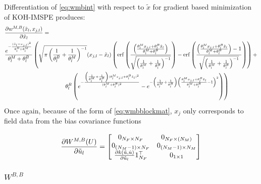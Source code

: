 \documentclass[
]{article}
\begin{document}
Differentiation of \eqref{eq:wmbint} with respect to \(\tilde{x}\) for
gradient based minimization of KOH-IMSPE produces:
\begin{equation}
\begin{split}
&\frac{\partial w^{M,B}(\tilde{x}_l,x_{j,l})}{\partial \tilde{x}_l} = \\
&\frac{e^{-\frac{(\tilde{x}_l - x_{j,l})^2}{\theta^B_l + \theta_l^M}}}{\theta_l^M + \theta^B_l} \left(\sqrt{\pi \left(\frac{1}{\theta^B_l} + \frac{1}{\theta_l^M}\right)^{-1}}(x_{j,l} -\tilde{x}_l)\left(\mathrm{erf}\left(\frac{\left(\frac{\theta_l^M x_{j,l} + \theta^B_l \tilde{x}_l}{\theta_l^M + \theta^B_l}\right)}{\sqrt{\left(\frac{1}{\theta_l^M} + \frac{1}{\theta^B_l}\right)^{-1}}}\right) - \mathrm{erf}\left(\frac{\left(\frac{\theta_l^M x_{j,l} + \theta^B_l \tilde{x}_l}{\theta_l^M + \theta^B_l}\right)-1}{\sqrt{\left(\frac{1}{\theta_l^M} + \frac{1}{\theta^B_l}\right)^{-1}}}\right)\right) + \right. \\
& \left. \phantom{\mathrm{erf}\left(\frac{\left(\frac{\theta_l^M x_{j,l} + \theta^B_l \tilde{x}_l}{\theta_l^M + \theta^B_l}\right)}{\sqrt{\left(\frac{1}{\theta_l^M} + \frac{1}{\theta^B_l}\right)^{-1}}}\right)} \theta^B_l \left(e^{-\frac{\left(\frac{1}{\theta_l^M} + \frac{1}{\theta^B_l}\right)(\theta_l^M x_{j,l} + \theta^B_l \tilde{x}_l)^2}{(\theta_l^M + \theta^B_l)^2}} - e^{-\left(\frac{1}{\theta_l^M} + \frac{1}{\theta^B_l}\right)\left(\frac{\theta_l^M x_{j,l} + \theta^B_l \tilde{x}_l}{\theta_l^M + \theta^B_l} - 1\right)^2}\right)\right)
\end{split}
\notag
\end{equation}
Once again, because of the form of \eqref{eq:wmbblockmat}, \(x_j\) only corresponds to field data from the bias covariance functions

\begin{equation}
\frac{\partial W^{M,B}(U)}{\partial \tilde{u}_l}=
\begin{bmatrix}
0_{N_F \times N_F} & 0_{N_F \times (N_M)}\\
0_{(N_M - 1) \times N_F} & 0_{(N_M -1) \times N_M}\\
\frac{\partial k(\tilde{u}, \hat{u})}{\partial \tilde{u}_l} 1^{\top}_{N_F} & 0_{1 \times 1}
\end{bmatrix}
\notag
\end{equation}

\hypertarget{wbb}{%
\subsubsection{\texorpdfstring{\(W^{B,B}\)}{W\^{}\{B,B\}}}\label{wbb}}
\end{document}
